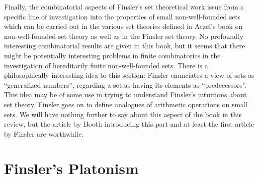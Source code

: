 Finally, the combinatorial aspects of Finsler's set theoretical work
issue from a specific line of investigation into the properties of
small non-well-founded sets which can be carried out in the various
set theories defined in Aczel's book on non-well-founded set theory as
well as in the Finsler set theory.  No profoundly interesting
combinatorial results are given in this book, but it seems that there
might be potentially interesting problems in finite combinatorics in
the investigation of hereditarily finite non-well-founded sets.  There
is a philosophically interesting idea to this section: Finsler
enunciates a view of sets as ``generalized numbers'', regarding a set
as having its elements as ``predecessors''.  This idea may be of some
use in trying to understand Finsler's intuitions about set theory.
Finsler goes on to define analogues of arithmetic operations on small
sets.  We will have nothing further to say about this aspect of the
book in this review, but the article by Booth introducing this part
and at least the first article by Finsler are worthwhile.

\section{Finsler's Platonism}

